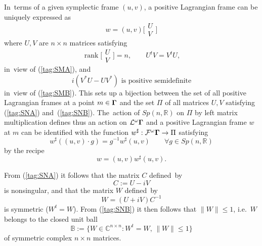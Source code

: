\documentclass[12pt]{amsart}
\numberwithin{equation}{section}
\theoremstyle{remark}
\let\Bbb\mathbb \let\Cal\mathcal \let\frak\mathfrak
\newcommand\Omg{{\bigam}}   %
\newcommand\FF{\Cal F}
\newcommand\LL{\Cal L}
\newcommand\FwM{\FF^\omega \Omg}
\newcommand\Lag{\LL^\omega \Omg}
\newcommand\rank{\operatorname{rank}}
\newcommand\RR{\mathbb R}
\newcommand{\CC}{\C}
\newcommand{\bigam}{\mbox{\boldmath $\Gamma$}}
\newcommand{\C}{\mathbb C}
\begin{document}
In~terms of a given symplectic frame $(u,v)$, a positive Lagrangian frame can
be uniquely expressed as
\begin{equation}  w=(u,v) \bigg[ \begin{matrix} U \\V \end{matrix} \bigg]
\label{tag:SMC}  \end{equation}
where $U,V$ are $n\times n$ matrices satisfying
\begin{equation}  \rank\bigg[\begin{matrix} U\\V\end{matrix}\bigg]=n,\qquad
U^tV=V^t U, \label{tag:SNA}  \end{equation}
in~view of (\ref{tag:SMA}), and
\begin{equation}  i(V^*U-UV^*)\text{ is positive semidefinite}  \label{tag:SNB}
\end{equation}
in~view of (\ref{tag:SMB}). This sets up a bijection between the set of all
positive Lagrangian frames at a point $m\in \Omg$ and the set $\Pi$ of all
matrices  $U,V$ satisfying (\ref{tag:SNA}) and~(\ref{tag:SNB}). The~action of
$Sp(n,\RR)$ on $\Pi$ by left matrix multiplication defines thus an action on
$\Lag$ and a positive Lagrangian frame $w$ at $m$ can be identified with the
function $w^\sharp:\FwM\to\Pi$ satisfying
$$ w^\sharp( (u,v)\cdot g) = g^{-1} w^\sharp (u,v)
\qquad \forall g\in Sp(n,\RR) $$
by the recipe
\begin{equation}  w= (u,v) w^\sharp(u,v).  \label{tag:SND}  \end{equation}

From (\ref{tag:SNA}) it follows that the matrix $C$ defined~by
$$ C:= U-iV  $$
is nonsingular, and that the matrix $W$ defined~by
$$ W=(U+iV)C^{-1}  $$
is symmetric ($W^t=W$). From (\ref{tag:SNB}) it then follows that $\|W\|\le1$,
i.e.~$W$ belongs to the closed unit ball
$$ \Bbb B := \{W\in\CC^{n\times n}: W^t=W,\,\|W\|\le 1\}  $$
of symmetric complex $n\times n$ matrices.
\end{document}

